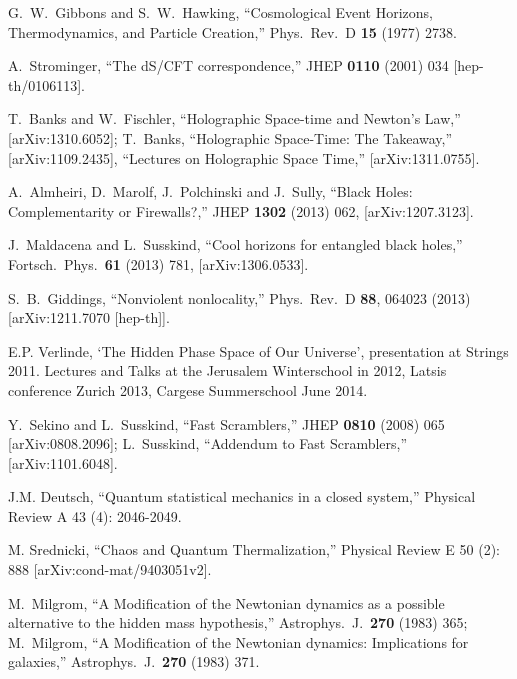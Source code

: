\documentclass[a4paper,12pt]{article}
\begin{document}
\begin{thebibliography}{100}
  G.~W.~Gibbons and S.~W.~Hawking,
  ``Cosmological Event Horizons, Thermodynamics, and Particle Creation,''
  Phys.\ Rev.\ D {\bf 15} (1977) 2738.

  A.~Strominger,
  ``The dS/CFT correspondence,''
  JHEP {\bf 0110} (2001) 034
  [hep-th/0106113].


T.~Banks and W.~Fischler,
 ``Holographic Space-time and Newton's Law,''
 [arXiv:1310.6052];
 T.~Banks,
 ``Holographic Space-Time: The Takeaway,''
 [arXiv:1109.2435], 
 ``Lectures on Holographic Space Time,''
 [arXiv:1311.0755].





  A.~Almheiri, D.~Marolf, J.~Polchinski and J.~Sully,
  ``Black Holes: Complementarity or Firewalls?,''
  JHEP {\bf 1302} (2013) 062, 
  [arXiv:1207.3123].

 J.~Maldacena and L.~Susskind,
 ``Cool horizons for entangled black holes,''
 Fortsch.\ Phys.\  {\bf 61} (2013) 781,
 [arXiv:1306.0533].


  S.~B.~Giddings,
  ``Nonviolent nonlocality,''
  Phys.\ Rev.\ D {\bf 88}, 064023 (2013)
  [arXiv:1211.7070 [hep-th]].

 E.P. Verlinde, `The Hidden Phase Space of Our Universe', presentation at Strings 2011.  Lectures and Talks at the  Jerusalem Winterschool in 2012, Latsis conference Zurich 2013, Cargese Summerschool June 2014. 

 Y.~Sekino and L.~Susskind,
 ``Fast Scramblers,''
 JHEP {\bf 0810} (2008) 065
 [arXiv:0808.2096];
  L.~Susskind,
 ``Addendum to Fast Scramblers,''
 [arXiv:1101.6048].
 
 
J.M. Deutsch,  ``Quantum statistical mechanics in a closed system,'' Physical Review A 43 (4): 2046-2049. 

M. Srednicki,  ``Chaos and Quantum Thermalization,'' Physical Review E 50 (2): 888 [arXiv:cond-mat/9403051v2].  



  M.~Milgrom,
  ``A Modification of the Newtonian dynamics as a possible alternative to the hidden mass hypothesis,''
  Astrophys.\ J.\  {\bf 270} (1983) 365;
  M.~Milgrom,
  ``A Modification of the Newtonian dynamics: Implications for galaxies,''
  Astrophys.\ J.\  {\bf 270} (1983) 371.


\end{thebibliography}
\end{document}
